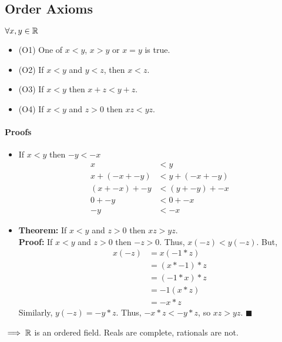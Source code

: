 \subsection{Order Axioms} $\forall x, y \in \mathbb{R}$
\begin{itemize}
    \item (O1) One of $x < y$, $x > y$ or $x = y$ is true.
    \item (O2) If $x < y$ and $y < z$, then $x < z$.
    \item (O3) If $x < y$ then $x + z < y + z$.
    \item (O4) If $x < y$ and $z > 0$ then $xz < yz$.
\end{itemize}

\paragraph{Proofs}
\begin{itemize}
    \item If $x < y$ then $-y < -x$
    \begin{align*}
        x &< y \\
        x + (-x + -y) &< y + (-x + -y) \\
        (x + -x) + -y &< (y + -y) + -x \\
        0 + -y &< 0 + -x \\
        -y &< -x
    \end{align*}

    \item \textbf{Theorem:} If $x < y$ and $z > 0$ then $xz > yz$. \\
    \textbf{Proof:} If $x < y$ and $z > 0$ then $-z > 0$. Thus, $x(-z) < y(-z)$. But,
    \begin{align*}
        x(-z) &= x(-1 * z) \\
        &= (x * -1) * z \\
        &= (-1 * x) * z \\
        &= -1 (x * z) \\
        &= -x * z
    \end{align*}
    Similarly, $y(-z) = -y * z$. Thus, $-x * z < -y * z$, so $xz > yz$. $\blacksquare$
\end{itemize}

$\implies \mathbb{R}$ is an ordered field. Reals are complete, rationals are not.